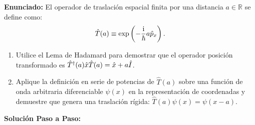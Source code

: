 \begin{ejemplobox}
    \textbf{Enunciado:} El operador de traslación espacial finita por una distancia $a \in \mathbb{R}$ se define como:
    \begin{equation}
        \hat{T}(a) \equiv \exp\left(-\frac{\mathrm{i}}{\hbar}a\hat{p}_x\right).
    \end{equation}
    \begin{enumerate}
        \item Utilice el Lema de Hadamard para demostrar que el operador posición transformado es $\hat{T}^\dagger(a)\hat{x}\hat{T}(a) = \hat{x} + a\hat{I}$.
        \item Aplique la definición en serie de potencias de $\hat{T}(a)$ sobre una función de onda arbitraria diferenciable $\psi(x)$ en la representación de coordenadas y demuestre que genera una traslación rígida: $\hat{T}(a)\psi(x) = \psi(x - a)$.
    \end{enumerate}

    \textbf{Solución Paso a Paso:}


\end{ejemplobox}
